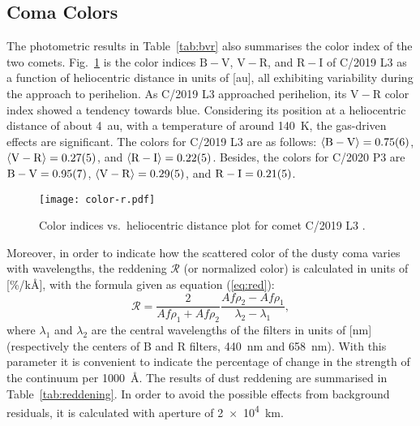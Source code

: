 \subsection{Coma Colors}

The photometric results in Table~\ref{tab:bvr} also summarises the color index of the two comets. 
Fig.~\ref{fig:color-r} is the color indices $\mathrm{B-V}$, $\mathrm{V-R}$, and $\mathrm{R-I}$ of C/2019 L3 as a function of heliocentric distance in units of [\unit{\astronomicalunit}], all exhibiting variability during the approach to perihelion. 
As C/2019 L3 approached perihelion, its $\mathrm{V-R}$ color index showed a tendency towards blue. 
Considering its position at a heliocentric distance of about {\qty{4}{\astronomicalunit}}, with a temperature of around {\qty{140}{\K}}, the gas-driven effects are significant. 
The colors for C/2019 L3 are as follows: 
$\langle \mathrm{B-V} \rangle = \num{0.75 +- 0.06}$, 
$\langle \mathrm{V-R} \rangle = \num{0.27 +- 0.05}$, and 
$\langle \mathrm{R-I} \rangle = \num{0.22 +- 0.05}$. 
Besides, the colors for C/2020 P3 are 
$\mathrm{B-V} = \num{0.95 +- 0.07}$, 
$\langle \mathrm{V-R} \rangle = \num{0.29 +- 0.05}$, and 
$\mathrm{R-I}= \num{0.21 +- 0.05}$. 

\begin{figure}
    \centering
    \texttt{[image: color-r.pdf]} 
    \caption{Color indices vs.\ heliocentric distance plot for comet C/2019 L3 .}\label{fig:color-r}
\end{figure}

Moreover, in order to indicate how the scattered color of the dusty coma varies with wavelengths, the reddening $\mathcal{R}$ (or normalized color) \citep{jewitt_cometary_1986, lara_behaviour_2003, mazzotta_epifani_dust_2011, shi_ccd_2015} is calculated in units of [\unit{\percent/\kilo\angstrom}], with the formula given as equation (\ref{eq:red}): 
\begin{equation}
\mathcal{R} = \frac{2}{Af\rho_1 + Af\rho_2} \frac{Af\rho_2 - Af\rho_1}{\lambda_2 - \lambda_1}, 
\label{eq:red}
\end{equation}
where $\lambda_1$ and $\lambda_2$ are the central wavelengths of the filters in units of [\unit{\nm}] (respectively the centers of B and R filters, {\qty{440}{\nm}} and {\qty{658}{\nm}}). With this parameter it is convenient to indicate the percentage of change in the strength of the continuum per {\qty{1000}{\angstrom}}. The results of dust reddening are summarised in Table~\ref{tab:reddening}. In order to avoid the possible effects from background residuals, it is calculated with aperture of {\qty{2e4}{\km}}. 

